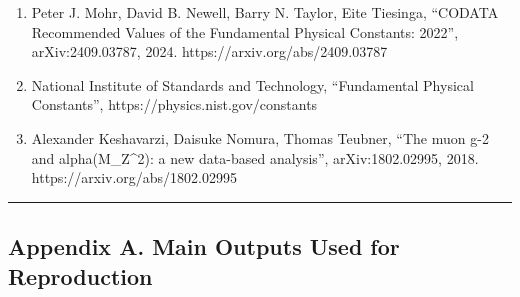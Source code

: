 \documentclass[
]{article}
\providecommand{\tightlist}{%
  \setlength{\itemsep}{0pt}\setlength{\parskip}{0pt}}
\begin{document}
\begin{enumerate}
\def\labelenumi{\arabic{enumi}.}
\setcounter{enumi}{9}
\tightlist
\item
  Peter J. Mohr, David B. Newell, Barry N. Taylor, Eite Tiesinga,
  ``CODATA Recommended Values of the Fundamental Physical Constants:
  2022'', arXiv:2409.03787, 2024. https://arxiv.org/abs/2409.03787
\item
  National Institute of Standards and Technology, ``Fundamental Physical
  Constants'', https://physics.nist.gov/constants
\item
  Alexander Keshavarzi, Daisuke Nomura, Thomas Teubner, ``The muon g-2
  and alpha(M\_Z\^{}2): a new data-based analysis'', arXiv:1802.02995,
  2018. https://arxiv.org/abs/1802.02995
\end{enumerate}

\begin{center}\rule{0.5\linewidth}{0.5pt}\end{center}

\subsection{Appendix A. Main Outputs Used for
Reproduction}\label{appendix-a.-main-outputs-used-for-reproduction}
\end{document}
